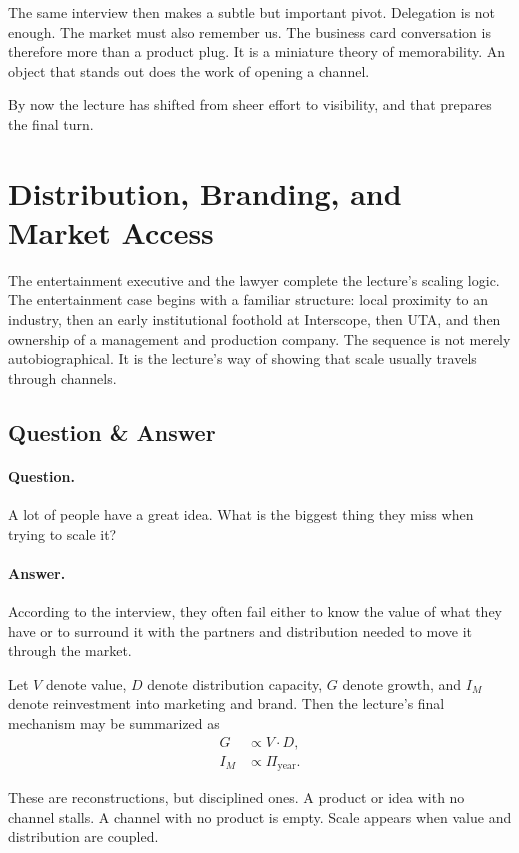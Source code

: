 The same interview then makes a subtle but important pivot. Delegation is not enough. The market must also remember us. The business card conversation is therefore more than a product plug. It is a miniature theory of memorability. An object that stands out does the work of opening a channel.

By now the lecture has shifted from sheer effort to visibility, and that prepares the final turn.

\section{Distribution, Branding, and Market Access}

The entertainment executive and the lawyer complete the lecture's scaling logic. The entertainment case begins with a familiar structure: local proximity to an industry, then an early institutional foothold at Interscope, then UTA, and then ownership of a management and production company. The sequence is not merely autobiographical. It is the lecture's way of showing that scale usually travels through channels.

\subsection{Question \& Answer}

\paragraph{Question.} A lot of people have a great idea. What is the biggest thing they miss when trying to scale it?

\paragraph{Answer.} According to the interview, they often fail either to know the value of what they have or to surround it with the partners and distribution needed to move it through the market.

Let \(V\) denote value, \(D\) denote distribution capacity, \(G\) denote growth, and \(I_M\) denote reinvestment into marketing and brand. Then the lecture's final mechanism may be summarized as
\begin{align}
G &\propto V\cdot D,\\
I_M &\propto \Pi_{\mathrm{year}}.
\end{align}

These are reconstructions, but disciplined ones. A product or idea with no channel stalls. A channel with no product is empty. Scale appears when value and distribution are coupled.

